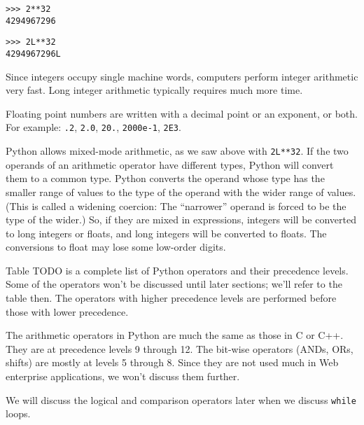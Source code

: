 \begin{verbatim}
>>> 2**32
4294967296
\end{verbatim}


\begin{verbatim}
>>> 2L**32
4294967296L
\end{verbatim}


Since integers occupy single
machine words, computers perform integer arithmetic very fast. Long
integer arithmetic typically requires much more time.

Floating point numbers are written
with a decimal point or an exponent, or both. For example: \texttt{.2},
\texttt{2.0}, \texttt{20.}, \texttt{2000e-1}, \texttt{2E3}.

Python allows mixed-mode
arithmetic, as we saw above with \texttt{2L**32}. If the two operands of
an arithmetic operator have different types, Python will convert them to
a common type. Python converts the operand whose type has the smaller
range of values to the type of the operand with the wider range of
values. (This is called a widening coercion: The ``narrower'' operand is
forced to be the type of the wider.) So, if they are mixed in
expressions, integers will be converted to long integers or floats, and
long integers will be converted to floats. The conversions to float may
lose some low-order digits.


Table TODO is a complete list of
Python operators and their precedence levels. Some of the operators
won't be discussed until later sections; we'll refer to the table then.
The operators with higher precedence levels are performed before those
with lower precedence.

The arithmetic operators in Python
are much the same as those in C or C++. They are at precedence levels 9
through 12. The bit-wise operators (ANDs, ORs, shifts) are mostly at
levels 5 through 8. Since they are not used much in Web enterprise
applications, we won't discuss them further.

We will discuss the logical and
comparison operators later when we discuss \texttt{while} loops.

